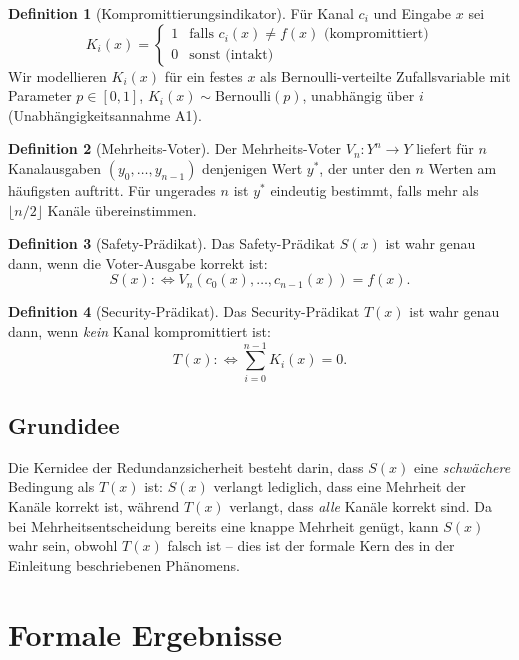 ﻿\documentclass[a4paper,12pt]{article}
\theoremstyle{definition}
\newtheorem{definition}{Definition}
\begin{document}
\begin{definition}[Kompromittierungsindikator]
	Für Kanal $c_i$ und Eingabe $x$ sei
	\[
	K_i(x) = \begin{cases}
		1 & \text{falls } c_i(x) \neq f(x) \text{ (kompromittiert)} \\
		0 & \text{sonst (intakt)}
	\end{cases}
	\]
	Wir modellieren $K_i(x)$ für ein festes $x$ als Bernoulli-verteilte Zufallsvariable mit Parameter $p \in [0,1]$, $K_i(x) \sim \mathrm{Bernoulli}(p)$, unabhängig über $i$ (Unabhängigkeitsannahme A1).
\end{definition}

\begin{definition}[Mehrheits-Voter]
	Der Mehrheits-Voter $V_n: Y^n \to Y$ liefert für $n$ Kanalausgaben $(y_0,\ldots,y_{n-1})$ denjenigen Wert $y^\ast$, der unter den $n$ Werten am häufigsten auftritt. Für ungerades $n$ ist $y^\ast$ eindeutig bestimmt, falls mehr als $\lfloor n/2 \rfloor$ Kanäle übereinstimmen.
\end{definition}

\begin{definition}[Safety-Prädikat]
	Das Safety-Prädikat $S(x)$ ist wahr genau dann, wenn die Voter-Ausgabe korrekt ist:
	\[
	S(x) :\Leftrightarrow V_n(c_0(x),\ldots,c_{n-1}(x)) = f(x).
	\]
\end{definition}

\begin{definition}[Security-Prädikat]
	Das Security-Prädikat $T(x)$ ist wahr genau dann, wenn \emph{kein} Kanal kompromittiert ist:
	\[
	T(x) :\Leftrightarrow \sum_{i=0}^{n-1} K_i(x) = 0.
	\]
\end{definition}

\subsection{Grundidee}

Die Kernidee der Redundanzsicherheit besteht darin, dass $S(x)$ eine \emph{schwächere} Bedingung als $T(x)$ ist: $S(x)$ verlangt lediglich, dass eine Mehrheit der Kanäle korrekt ist, während $T(x)$ verlangt, dass \emph{alle} Kanäle korrekt sind. Da bei Mehrheitsentscheidung bereits eine knappe Mehrheit genügt, kann $S(x)$ wahr sein, obwohl $T(x)$ falsch ist -- dies ist der formale Kern des in der Einleitung beschriebenen Phänomens.

\section{Formale Ergebnisse}
\end{document}
